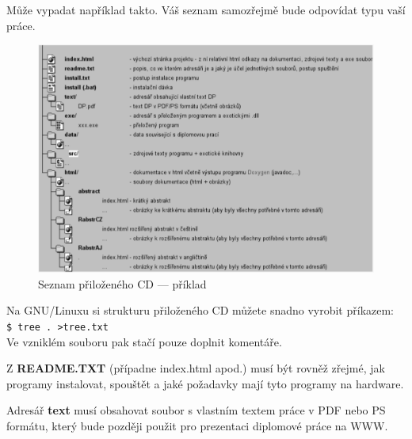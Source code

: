 \documentclass[11pt,twoside,a4paper]{book}
\begin{document}
Může vypadat například takto. Váš seznam samozřejmě bude odpovídat typu vaší práce. 

\begin{figure}[H]
\begin{center}
\includegraphics[width=14cm]{figures/seznamcd}
\caption{Seznam přiloženého CD --- příklad}
\label{fig:seznamcd}
\end{center}
\end{figure}

Na GNU/Linuxu si strukturu přiloženého CD můžete snadno vyrobit příkazem:\\ 
\verb|$ tree . >tree.txt|\\
Ve vzniklém souboru pak stačí pouze doplnit komentáře.

Z \textbf{README.TXT} (případne index.html apod.)  musí být rovněž zřejmé, jak programy instalovat, spouštět a jaké požadavky mají tyto programy na hardware.

Adresář \textbf{text}  musí obsahovat soubor s vlastním textem práce v PDF nebo PS formátu, který bude později použit pro prezentaci diplomové práce na WWW.
 

\end{document}
